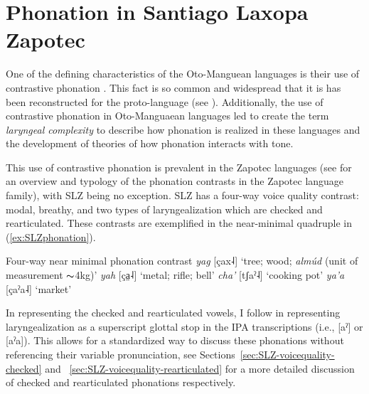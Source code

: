 \section{Phonation in Santiago Laxopa Zapotec} \label{sec:SLZ-voicequality}

One of the defining characteristics of the Oto-Manguean languages is their use of contrastive phonation \citep{campbellOtomangueanHistoricalLinguistics2017,campbellOtomangueanHistoricalLinguistics2017a}. This fact is so common and widespread that it is has been reconstructed for the proto-language (see \cite{renschComparativeOtomangueanPhonology1976}). Additionally, the use of contrastive phonation in Oto-Manguaean languages led \citet{silvermanLaryngealComplexityOtomanguean1997,silvermanPhasingRecoverability1997} to create the term \textit{laryngeal complexity} to describe how phonation is realized in these languages and the development of theories of how phonation interacts with tone. 

This use of contrastive phonation is prevalent in the Zapotec languages (see \cite{ariza-garciaPhonationTypesTones2018} for an overview and typology of the phonation contrasts in the Zapotec language family), with SLZ being no exception. SLZ
has a four-way voice quality contrast: modal, breathy, and two types of laryngealization which are checked and rearticulated. These contrasts are exemplified in the near-minimal quadruple in (\ref{ex:SLZphonation}).

\ea \label{ex:SLZphonation} Four-way near minimal phonation contrast
    \ea \textit{yag}   [çax˨] `tree; wood; \textit{almúd} (unit of measurement  $\thicksim$4kg)'
    \ex \textit{yah}   [ça̤˨] `metal; rifle; bell'
    \ex \textit{cha'}  [tʃaˀ˨]  `cooking pot'
    \ex \textit{ya'a}  [çaˀa˨] `market'
    \z
\z

In representing the checked and rearticulated vowels, I follow \citet{avelinoAcousticElectroglottographicAnalyses2010, uchiharaToneRegistrogenesisQuiavini2016} in representing laryngealization as a superscript glottal stop in the IPA transcriptions (i.e., [aˀ] or [aˀa]). This allows for a standardized way to discuss these phonations without referencing their variable pronunciation, see Sections~\ref{sec:SLZ-voicequality-checked} and ~\ref{sec:SLZ-voicequality-rearticulated} for a more detailed discussion of checked and rearticulated phonations respectively. 

